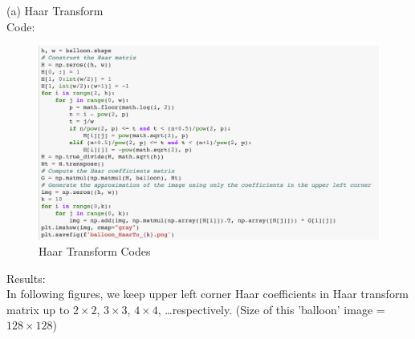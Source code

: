 \documentclass[12pt]{article}
\begin{document}
\noindent
(a) Haar Transform\\
Code:
\begin{figure}[H]
    \centering
    \includegraphics[width=1\textwidth]{haar_code.png}
    \caption{Haar Transform Codes}
\end{figure}
\noindent
Results:\\
In following figures, we keep upper left corner Haar coefficients in Haar transform matrix up to  $2 \times 2$, 
$3 \times 3$, $4 \times 4$, \dots respectively.
(Size of this 'balloon' image = $128 \times 128$)
\end{document}
